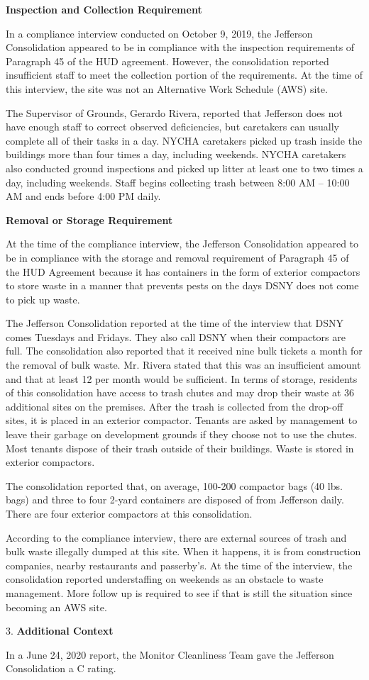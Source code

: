 

\textbf{Inspection and Collection Requirement}

In a compliance interview conducted on October 9, 2019, the Jefferson Consolidation appeared to be in compliance with the inspection requirements of Paragraph 45 of the HUD agreement. However, the consolidation reported insufficient staff to meet the collection portion of the requirements. At the time of this interview, the site was not an Alternative Work Schedule (AWS) site. 

The Supervisor of Grounds, Gerardo Rivera, reported that Jefferson does not have enough staff to correct observed deficiencies, but caretakers can usually complete all of their tasks in a day. NYCHA caretakers picked up trash inside the buildings more than four times a day, including weekends. NYCHA caretakers also conducted ground inspections and picked up litter at least one to two times a day, including weekends. Staff begins collecting trash between 8:00 AM -- 10:00 AM and ends before 4:00 PM daily.

\textbf{Removal or Storage Requirement}

At the time of the compliance interview, the Jefferson Consolidation appeared to be in compliance with the storage and removal requirement of Paragraph 45 of the HUD Agreement because it has containers in the form of exterior compactors to store waste in a manner that prevents pests on the days DSNY does not come to pick up waste.

The Jefferson Consolidation reported at the time of the interview that DSNY comes Tuesdays and Fridays. They also call DSNY when their compactors are full. The consolidation also reported that it received nine bulk tickets a month for the removal of bulk waste. Mr. Rivera stated that this was an insufficient amount and that at least 12 per month would be sufficient.  In terms of storage, residents of this consolidation have access to trash chutes and may drop their waste at 36 additional sites on the premises. After the trash is collected from the drop-off sites, it is placed in an exterior compactor. Tenants are asked by management to leave their garbage on development grounds if they choose not to use the chutes. Most tenants dispose of their trash outside of their buildings. Waste is stored in exterior compactors. 

The consolidation reported that, on average, 100-200 compactor bags (40 lbs. bags) and three to four 2-yard containers are disposed of from Jefferson daily. There are four exterior compactors at this consolidation.

According to the compliance interview, there are external sources of trash and bulk waste illegally dumped at this site. When it happens, it is from construction companies, nearby restaurants and passerby's. At the time of the interview, the consolidation reported understaffing on weekends as an obstacle to waste management. More follow up is required to see if that is still the situation since becoming an AWS site.

3. \textbf{Additional Context} 

In a June 24, 2020 report, the Monitor Cleanliness Team gave the Jefferson Consolidation a C rating. 
